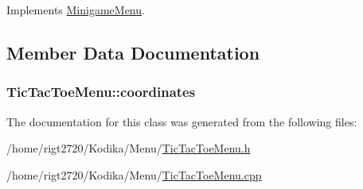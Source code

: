 Implements \hyperlink{classMinigameMenu_abde3ae319bf1660a8626c6f765e054a8}{Minigame\-Menu}.



\subsection{Member Data Documentation}
\hypertarget{classTicTacToeMenu_a80887137031e237b126b2c36b377b2dd}{
\subsubsection[{coordinates}]{ Tic\-Tac\-Toe\-Menu\-::coordinates\hspace{0.3cm}{\ttfamily [private]}}}\label{classTicTacToeMenu_a80887137031e237b126b2c36b377b2dd}


The documentation for this class was generated from the following files\-:\begin{DoxyCompactItemize}
\item 
/home/rigt2720/\-Kodika/\-Menu/\hyperlink{TicTacToeMenu_8h}{Tic\-Tac\-Toe\-Menu.\-h}\item 
/home/rigt2720/\-Kodika/\-Menu/\hyperlink{TicTacToeMenu_8cpp}{Tic\-Tac\-Toe\-Menu.\-cpp}\end{DoxyCompactItemize}
